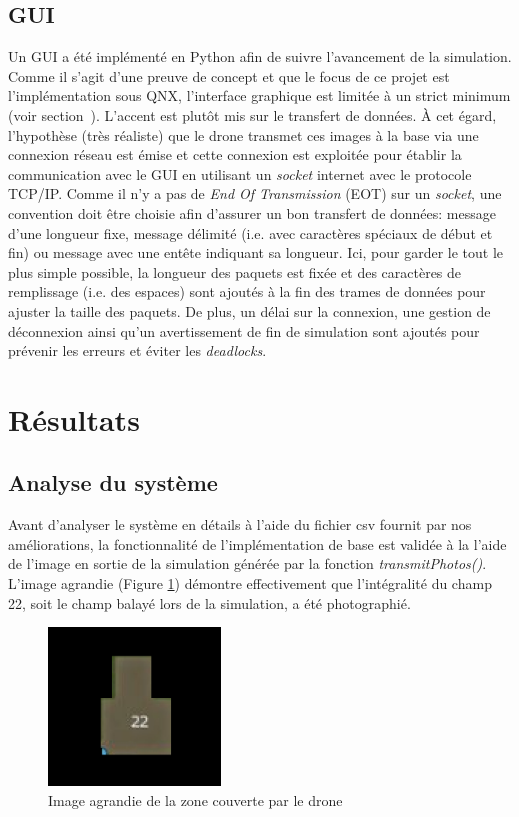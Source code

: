 \documentclass[journal]{IEEEtran}
\begin{document}
\subsection{GUI}
Un GUI a été implémenté en Python afin de suivre l'avancement de la simulation. Comme il s'agit d'une preuve de concept et que le focus de ce projet est l'implémentation sous QNX, l'interface graphique est limitée à un strict minimum (voir section~). L'accent est plutôt mis sur le transfert de données. À cet égard, l'hypothèse (très réaliste) que le drone transmet ces images à la base via une connexion réseau est émise et cette connexion est exploitée pour établir la communication avec le GUI en utilisant un \textit{socket} internet avec le protocole TCP/IP. Comme il n'y a pas de \textit{End Of Transmission} (EOT) sur un \textit{socket}, une convention doit être choisie afin d'assurer un bon transfert de données: message d'une longueur fixe, message délimité (i.e. avec caractères spéciaux de début et fin) ou  message avec une entête indiquant sa longueur. Ici, pour garder le tout le plus simple possible, la longueur des paquets est fixée et des caractères de remplissage (i.e. des espaces) sont ajoutés à la fin des trames de données pour ajuster la taille des paquets. De plus, un délai sur la connexion, une gestion de déconnexion ainsi qu'un avertissement de fin de simulation sont ajoutés pour prévenir les erreurs et éviter les \textit{deadlocks}.

\section{Résultats}\label{resultats}

\subsection{Analyse du système}
Avant d'analyser le système en détails à l'aide du fichier csv fournit par nos améliorations, la fonctionnalité de l'implémentation de base est validée à la l'aide de l'image en sortie de la simulation générée par la fonction \textit{transmitPhotos()}. L'image agrandie (Figure \ref{fig:farmMap}) démontre effectivement que l'intégralité du champ 22, soit le champ balayé lors de la simulation, a été photographié.

\begin{figure}
	\centering
	\captionsetup{justification=centering}
	\includegraphics[width=1.8in]{farmMap.png}
	\caption{Image agrandie de la zone couverte par le drone}
	\label{fig:farmMap}
\end{figure}
\end{document}
